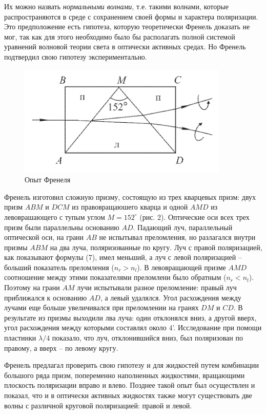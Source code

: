 \documentclass[14pt]{article}
\begin{document}
Их можно назвать \textsl{нормальными волнами}, т.е. такими волнами, которые распространяются в среде с сохранением своей формы и характера поляризации. Это предположение есть гипотеза, которую теоретически Френель доказать не мог, так как для этого необходимо было бы располагать полной системой уравнений волновой теории света в оптически активных средах. Но Френель подтвердил свою гипотезу экспериментально.

\begin{figure}
\centering
	\includegraphics[width=10cm]{2}
	\caption{Опыт Френеля}
\end{figure}

Френель изготовил сложную призму, состоящую из трех кварцевых призм: двух призм $ABM$ и $DCM$ из правовращаюшего кварца и одной $AMD$ из левоврашающего с тупым углом 
$M = 152^\circ$ (рис. 2). Оптические оси всех трех призм были параллельны основанию $AD$. Падающий луч, параллельный оптической оси, на грани $AB$ не испытывал преломления, но разлагался внутри призмы $ABM$ на два луча, поляризованные по кругу. Луч с правой поляризацией, как показывают формулы (7), имел меньший, а луч с левой поляризацией -- больший показатель преломления ($n_r > n_l$). В левовращающей призме $AMD$ соотношение между этими показателями преломлени было обратным ($n_r < n_l$). Поэтому на грани $AM$ лучи испытывали разное преломление: правый луч приближался к основанию $AD$, а левый удалялся. Угол расхождения между лучами еще больше увеличивался при преломлении на гранях $DM$ и $CD$. В результате из призмы выходили лва луча: один отклонялся вниз, а другой вверх, угол расхождения между которыми составлял около 4’. Исследование при помощи пластинки $\lambda/4$ показало, что луч, отклонившийся вниз, был поляризован по правому, а вверх -- по левому кругу.

Френель предлагал проверить свою гипотезу и для жидкостей путем комбинации большого ряда призм, попеременно наполненных жидкостями, вращающими плоскость поляризации вправо и влево. Позднее такой опыт был осуществлен и показал, что и в оптически активных жидкостях также могут существовать две волны с различной круговой поляризацией: правой и левой.
\end{document}

